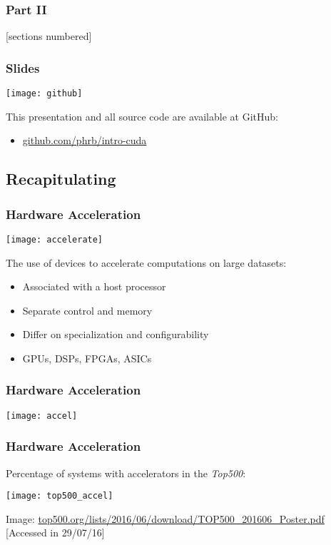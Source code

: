 \documentclass[10pt, compress]{beamer}
\begin{document}
\begin{frame}
    \frametitle{Part II}
    [sections numbered]
    \tableofcontents[hideallsubsections, part=2]
\end{frame}

\begin{frame}
    \frametitle{Slides}
    \begin{center}
        \texttt{[image: github]}
    \end{center}
    This presentation and all source code are available
    at \alert{GitHub}:

    \begin{itemize}
        \item \url{github.com/phrb/intro-cuda}
    \end{itemize}
\end{frame}

\subsection{Recapitulating}

\begin{frame}
    \frametitle{Hardware Acceleration}
    \begin{center}
        \texttt{[image: accelerate]}
    \end{center}

    The use of \alert{devices} to accelerate computations on large datasets:

    \begin{itemize}
        \item Associated with a \alert{host} processor
        \item Separate \alert{control} and \alert{memory}
        \item Differ on \alert{specialization} and \alert{configurability}
        \item \alert{GPUs}, DSPs, FPGAs, ASICs
    \end{itemize}
\end{frame}

\begin{frame}
    \frametitle{Hardware Acceleration}
    \centering
    \texttt{[image: accel]}
\end{frame}

\begin{frame}
    \frametitle{Hardware Acceleration}
    Percentage of systems with accelerators in the \textit{Top500}:

    \begin{center}
    \texttt{[image: top500\_accel]}
    \hfill

        \tiny{Image: \url{top500.org/lists/2016/06/download/TOP500_201606_Poster.pdf} [Accessed in 29/07/16]}
    \end{center}
\end{frame}
\end{document}
